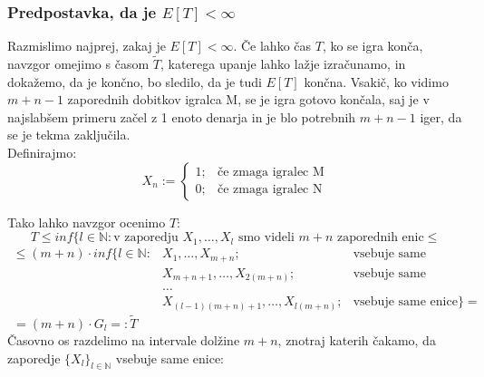 \documentclass[12pt, a4paper]{article}
\begin{document}
\subsubsection{Predpostavka, da je $E[T] < \infty$}
Razmislimo najprej, zakaj je $E[T] <\infty$. Če lahko čas $T$, ko se igra konča, navzgor omejimo s časom $\widetilde{T}$, katerega upanje lahko lažje izračunamo, in dokažemo, da je končno, bo sledilo, da je tudi $E[T]$ končna. Vsakič, ko vidimo $m+n-1$ zaporednih dobitkov igralca M, se je igra gotovo končala, saj je v najslabšem primeru začel z 1 enoto denarja in je blo potrebnih $m+n-1$ iger, da se je tekma zaključila.\\

Definirajmo: 
\[
X_n := \left\{
\begin{array}{rl}
1; & \textrm{če zmaga igralec M}\\
0; & \textrm{če zmaga igralec N}
\end{array}
\right.
\]

Tako lahko navzgor ocenimo $T$:
$$T \leq inf\{ l \in \mathbb{N}: \textrm{v zaporedju } X_1, \dots, X_l \textrm{ smo videli } m+n \textrm{ zaporednih enic} \leq$$ 
$$
\begin{array} {lll} 
\leq (m+n)\cdot inf\{ l \in \mathbb{N}:& X_1, \dots, X_{m+n}; & \textrm{vsebuje same enice, ali} \\ 
&X_{m+n+1}, \dots, X_{2(m+n)};& \textrm{vsebuje same enice, ali}\\
&\dots \\
&X_{(l-1)(m+n)+1}, \dots, X_{l(m+n)}; & \textrm{vsebuje same enice}\}=
\end{array}$$
$~~= (m+n)\cdot G_l =: \widetilde{T}$\\

Časovno os razdelimo na intervale dolžine $m+n$, znotraj katerih čakamo, da zaporedje $\{X_l\}_{l \in \mathbb{N}}$ vsebuje same enice:
\begin{center}
\end{center}
\end{document}
